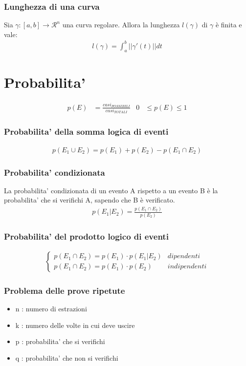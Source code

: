 \documentclass[a4paper]{article}
\begin{document}
	\subsubsection{Lunghezza di una curva}
	Sia $\gamma : [a,b] \to \mathcal{R}^n$ una curva regolare. Allora la lunghezza $l(\gamma)$ di $\gamma$ è finita e vale:
	\begin{align*}
		l(\gamma) = \int_{a}^{b} || \gamma'(t) ||dt
	\end{align*}
	
	\newpage
	\section{Probabilita'}
	\begin{align*}
		p(E) & = \frac{casi_{POSSIBILI}}{casi_{TOTALI}} & 0 & \le p(E) \le 1
	\end{align*}
	
	\subsubsection{Probabilita' della somma logica di eventi}
	\begin{align*}
		p(E_1 \cup E_2) = p(E_1) + p(E_2) - p(E_1 \cap E_2)
	\end{align*}
	
	\subsubsection{Probabilita' condizionata}
	La probabilita' condizionata di un evento A rispetto a un evento B è la probabilita' che si verifichi A, sapendo che B è verificato.
	\begin{align*}
		p(E_1 | E_2) = \frac{p(E_1 \cap E_2)}{p(E_2)}
	\end{align*}
	
	\subsubsection{Probabilita' del prodotto logico di eventi}
	\begin{align*}
		\begin{cases}
		p(E_1 \cap E_2) = p(E_1) \cdot p(E_1 | E_2)	& dipendenti\\
		p(E_1 \cap E_2) = p(E_1) \cdot p(E_2)		& indipendenti
		\end{cases}
	\end{align*}
	
	\subsubsection{Problema delle prove ripetute}
	\begin{itemize}
		\item n : numero di estrazioni
		\item k : numero delle volte in cui deve uscire
		\item p : probabilita' che si verifichi
		\item q : probabilita' che non si verifichi
	\end{itemize}
\end{document}
